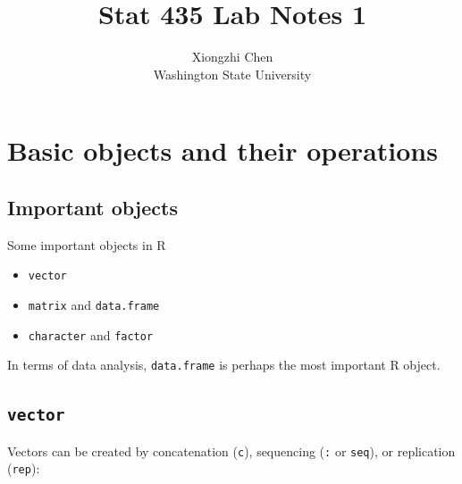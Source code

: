 \documentclass[]{article}
\title{Stat 435 Lab Notes 1}
\author{Xiongzhi Chen \\ Washington State University}
\date{}
\providecommand{\tightlist}{%
  \setlength{\itemsep}{0pt}\setlength{\parskip}{0pt}}
\begin{document}
\maketitle

{
\setcounter{tocdepth}{2}
\tableofcontents
}
\section{}\label{section}

\section{Basic objects and their
operations}\label{basic-objects-and-their-operations}

\subsection{Important objects}\label{important-objects}

Some important objects in R

\begin{itemize}
\tightlist
\item
  \texttt{vector}
\item
  \texttt{matrix} and \texttt{data.frame}
\item
  \texttt{character} and \texttt{factor}
\end{itemize}

In terms of data analysis, \texttt{data.frame} is perhaps the most
important R object.

\subsection{\texorpdfstring{\texttt{vector}}{vector}}\label{vector}

Vectors can be created by concatenation (\texttt{c}), sequencing
(\texttt{:} or \texttt{seq}), or replication (\texttt{rep}):
\end{document}
